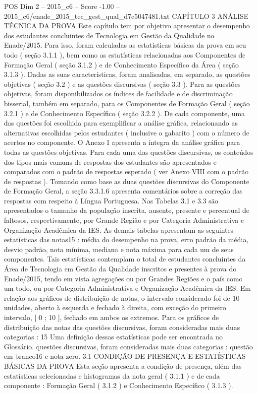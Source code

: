 \begin{textsample}{POS Dim 2 – 2015\_c6 – Score -1.00 – 2015\_c6/enade\_2015\_tec\_gest\_qual\_d7c5047481.txt}  \label{ex:f2_pos_244}
CAPÍTULO 3 ANÁLISE TÉCNICA DA PROVA Este capítulo tem por objetivo apresentar o desempenho dos estudantes concluintes de Tecnologia em Gestão da Qualidade no Enade/2015.
Para isso, foram calculadas as estatísticas básicas da prova em seu todo ( seção 3.1.1 ), bem como as estatísticas relacionadas aos Componentes de Formação Geral ( seção 3.1.2 ) e de Conhecimento Específico da Área ( seção 3.1.3 ).
Dadas as suas características, foram analisadas, em separado, as questões objetivas ( seção 3.2 ) e as questões discursivas ( seção 3.3 ).
Para as questões objetivas, foram disponibilizados os índices de facilidade e de discriminação bisserial, também em separado, para os Componentes de Formação Geral ( seção 3.2.1 ) e de Conhecimento Específico ( seção 3.2.2 ).
De cada componente, uma das questões foi escolhida para exemplificar a análise gráfica, relacionando as alternativas escolhidas pelos estudantes ( inclusive o gabarito ) com o número de acertos no componente.
O Anexo I apresenta a íntegra da análise gráfica para todas as questões objetivas.
Para cada uma das questões discursivas, os conteúdos dos tipos mais comuns de respostas dos estudantes são apresentados e comparados com o padrão de respostas esperado ( ver Anexo VIII com o padrão de respostas ).
Tomando como base as duas questões discursivas do Componente de Formação Geral, a seção 3.3.1.6 apresenta comentários sobre a correção das respostas com respeito à Língua Portuguesa.
Nas Tabelas 3.1 e 3.3 são apresentados o tamanho da população inscrita, ausente, presente e percentual de faltosos, respectivamente, por Grande Região e por Categoria Administrativa e Organização Acadêmica da IES.
As demais tabelas apresentam as seguintes estatísticas das notas15 : média do desempenho na prova, erro padrão da média, desvio padrão, nota mínima, mediana e nota máxima para cada um de seus componentes.
Tais estatísticas contemplam o total de estudantes concluintes da Área de Tecnologia em Gestão da Qualidade inscritos e presentes à prova do Enade/2015, tendo em vista agregações ou por Grandes Regiões e o país como um todo, ou por Categoria Administrativa e Organização Acadêmica da IES.
Em relação aos gráficos de distribuição de notas, o intervalo considerado foi de 10 unidades, aberto à esquerda e fechado à direita, com exceção do primeiro intervalo, [ 0 ; 10 ], fechado em ambos os extremos.
Para os gráficos de distribuição das notas das questões discursivas, foram consideradas mais duas categorias : 15 Uma definição dessas estatísticas pode ser encontrada no Glossário. questões discursivas, foram consideradas mais duas categorias : questão em branco16 e nota zero. 3.1 CONDIÇÃO DE PRESENÇA E ESTATÍSTICAS BÁSICAS DA PROVA Esta seção apresenta a condição de presença, além das estatísticas selecionadas e histogramas da nota geral ( 3.1.1 ) e de cada componente : Formação Geral ( 3.1.2 ) e Conhecimento Específico ( 3.1.3 ).

\end{textsample}
